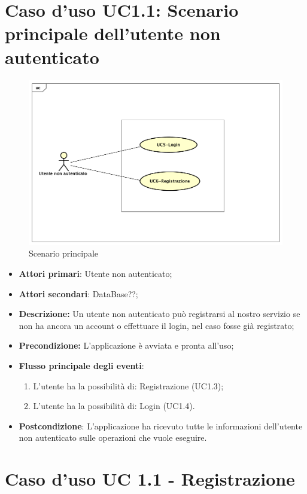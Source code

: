 \section{Caso d'uso UC1.1: Scenario principale dell'utente non autenticato}
\begin{figure} [h]
	\centering
	\includegraphics[scale=0.4]{./Diagram/UC1.png}
	\caption{Scenario principale}\label{}
\end{figure}
\begin{itemize}
	\item \textbf{Attori primari}: Utente non autenticato;
	\item \textbf{Attori secondari}: DataBase??;
	\item \textbf{Descrizione:} Un utente non  autenticato può registrarsi al nostro servizio se non ha ancora un account o effettuare il login, nel caso fosse già registrato;
	\item \textbf{Precondizione:} L'applicazione è avviata e pronta all'uso;
	\item \textbf{Flusso principale degli eventi}:
		\begin{enumerate}
			\item L'utente ha la possibilità di: Registrazione (UC1.3);
			\item L'utente ha la possibilità di: Login (UC1.4).
		\end{enumerate}
		\item \textbf{Postcondizione}: L'applicazione ha ricevuto tutte le informazioni dell'utente non autenticato sulle operazioni che vuole eseguire.
\end{itemize}
\section{Caso d'uso UC 1.1 - Registrazione}
